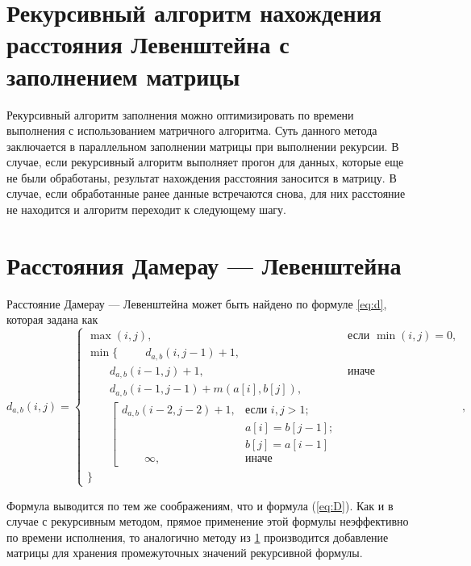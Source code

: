     \section{Рекурсивный алгоритм нахождения расстояния Левенштейна с заполнением матрицы}
        \label{sec:recmat}
        
        Рекурсивный алгоритм заполнения можно оптимизировать по времени выполнения с использованием матричного алгоритма. Суть данного метода заключается в параллельном заполнении матрицы при выполнении рекурсии. В случае, если рекурсивный алгоритм выполняет прогон для данных, которые еще не были обработаны, результат нахождения расстояния заносится в матрицу. В случае, если обработанные ранее данные встречаются снова, для них расстояние не находится и алгоритм переходит к следующему шагу.
    
    \section{Расстояния Дамерау — Левенштейна}
    
        Расстояние Дамерау — Левенштейна может быть найдено по формуле \ref{eq:d}, которая задана как
        \begin{equation}
        	\label{eq:d}
        	d_{a,b}(i, j) = \begin{cases}
        		\max(i, j), &\text{если }\min(i, j) = 0,\\
        		\min \lbrace \      \
        			\qquad d_{a,b}(i, j-1) + 1,\\
        			\qquad d_{a,b}(i-1, j) + 1, &\text{иначе}\\
        			\qquad d_{a,b}(i-1, j-1) + m(a[i], b[j]),\\
        			\qquad \left[ \begin{array}{cc}d_{a,b}(i-2, j-2) + 1, &\text{если }i,j > 1;\\
        			\qquad &\text{}a[i] = b[j-1]; \\
        			\qquad &\text{}b[j] = a[i-1]\\
        			\qquad \infty, & \text{иначе}\end{array}\right.\\
        		\rbrace
        		\end{cases},
        \end{equation}
        
        Формула выводится по тем же соображениям, что и формула (\ref{eq:D}).
        Как и в случае с рекурсивным методом, прямое применение этой формулы неэффективно по времени исполнения, то аналогично методу из \ref{sec:recmat} производится добавление матрицы для хранения промежуточных значений рекурсивной формулы.
    
